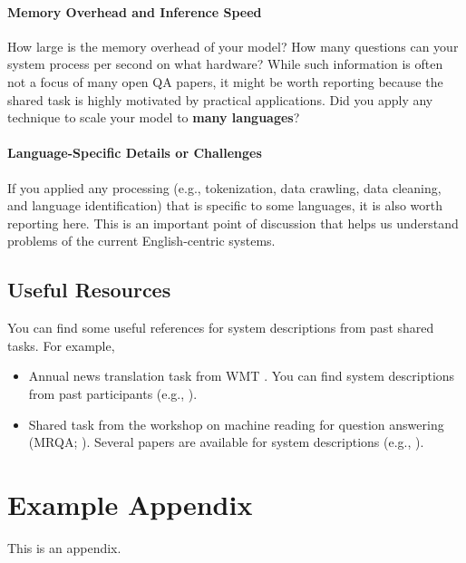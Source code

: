 \documentclass[11pt]{article}
\begin{document}
\paragraph{Memory Overhead and Inference Speed}
How large is the memory overhead of your model? 
How many questions can your system process per second on what hardware?
While such information is often not a focus of many open QA papers, it might be worth reporting because the shared task is highly motivated by practical applications.
Did you apply any technique to scale your model to \textbf{many languages}?

\paragraph{Language-Specific Details or Challenges}
If you applied any processing (e.g., tokenization, data crawling, data cleaning, and language identification) that is specific to some languages, it is also worth reporting here. This is an important point of discussion that helps us understand problems of the current English-centric systems. 

\subsection{Useful Resources}
You can find some useful references for system descriptions from past shared tasks. For example,
\begin{itemize}
\item Annual news translation task from WMT \cite{barrault-etal-2020-findings,akhbardeh-etal-2021-findings}.
You can find system descriptions from past participants (e.g., \citealp{ng-etal-2019-facebook,marchisio-etal-2019-johns}).
\item Shared task from the workshop on machine reading for question answering (MRQA; \citealp{fisch-etal-2019-mrqa}). Several papers are available for system descriptions (e.g., \citealp{longpre-etal-2019-exploration,li-etal-2019-net}).
\end{itemize}




\appendix

\section{Example Appendix}
\label{sec:appendix}

This is an appendix.
\end{document}
